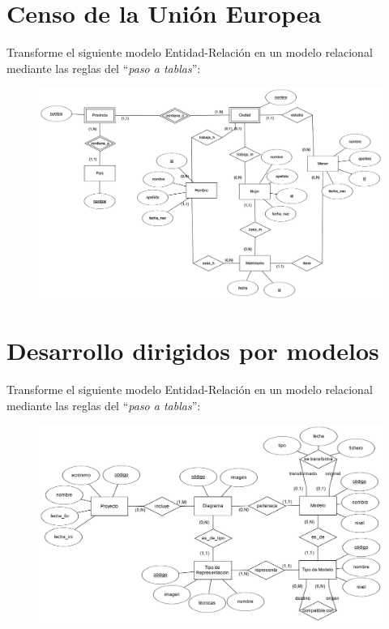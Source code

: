 \documentclass{db-practice}
\begin{document}
\section{Censo de la Unión Europea}

Transforme el siguiente modelo Entidad-Relación en un modelo relacional mediante las reglas del ``\textit{paso a tablas}'':

\begin{figure}[H]
    \centering
    \includegraphics[width=.9\textwidth]{figs/censo-union-europea}
\end{figure}

\section{Desarrollo dirigidos por modelos}

Transforme el siguiente modelo Entidad-Relación en un modelo relacional mediante las reglas del ``\textit{paso a tablas}'':

\begin{figure}[H]
    \centering
    \includegraphics[width=\textwidth]{figs/desarrollo-dirigido-por-modelos}
\end{figure}
\end{document}
